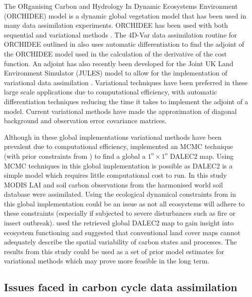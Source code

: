 The ORganising Carbon and Hydrology In Dynamic Ecosystems Environment (ORCHIDEE) model \citep{Krinner2005} is a dynamic global vegetation model that has been used in many data assimilation experiments. ORCHIDEE has been used with both sequential \citep{Demarty2007} and variational methods \citep{Bacour2015}. The 4D-Var data assimilation routine for ORCHIDEE outlined in \citet{Kuppel2012} also uses automatic differentiation to find the adjoint of the ORCHIDEE model used in the calculation of the derivative of the cost function. An adjoint has also recently been developed for the Joint UK Land Environment Simulator (JULES) model to allow for the implementation of variational data assimilation \citep{raoult2016land}. Variational techniques have been preferred in these large scale applications due to computational efficiency, with automatic differentiation techniques reducing the time it takes to implement the adjoint of a model. Current variational methods have made the approximation of diagonal background and observation error covariance matrices. %

Although in these global implementations variational methods have been prevalent due to computational efficiency, \citet{bloom2016decadal} implemented an MCMC technique (with prior constraints from \citet{Bloom2015}) to find a global a \(1^\text{o} \times 1^\text{o}\) DALEC2 map. Using MCMC techniques in this global implementation is possible as DALEC2 is a simple model which requires little computational cost to run. In this study MODIS LAI and soil carbon observations from the harmonised world soil database were assimilated. Using the ecological dynamical constraints from \citet{Bloom2015} in this global implementation could be an issue as not all ecosystems will adhere to these constraints (especially if subjected to severe disturbances such as fire or insect outbreak). \citet{bloom2016decadal} used the retrieved global DALEC2 map to gain insight into ecosystem functioning and suggested that conventional land cover maps cannot adequately describe the spatial variability of carbon states and processes. The results from this study could be used as a set of prior model estimates for variational methods which may prove more feasible in the long term. 

\subsection{Issues faced in carbon cycle data assimilation}

